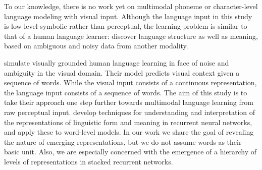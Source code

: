 To our knowledge, there is no work yet on multimodal phoneme or character-level language modeling with visual input.
Although the language input in this study is low-level-symbolic rather
than perceptual, the learning problem is similar to that of a human language learner: discover language structure as well as meaning, based on ambiguous and noisy data from another modality. 

 simulate visually grounded human
language learning in face of noise and ambiguity in the visual
domain. Their model predicts visual context given a sequence of words. While the visual input consists of a continuous representation, the language input consists of a sequence of words. The aim of this study is to take their approach one step further towards multimodal language learning from raw perceptual input. 
 develop techniques for understanding
and interpretation of the representations of linguistic form and
meaning in recurrent neural networks, and apply these to word-level
models. In our work we share the goal of revealing the nature of
emerging representations, but we do not assume words as their basic
unit. Also, we are especially concerned with the emergence of a
hierarchy of levels of representations in stacked recurrent networks. 